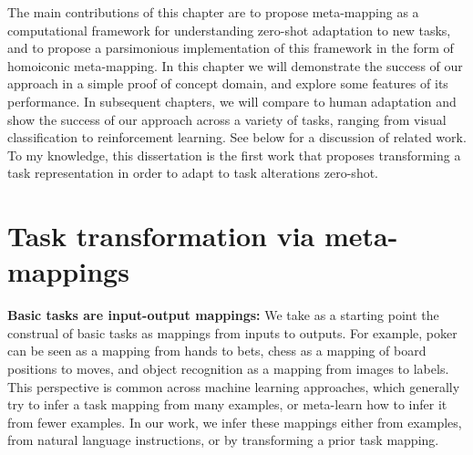 
The main contributions of this chapter are to propose meta-mapping as a computational framework for understanding zero-shot adaptation to new tasks, and to propose a parsimonious implementation of this framework in the form of homoiconic meta-mapping. In this chapter we will demonstrate the success of our approach in a simple proof of concept domain, and explore some features of its performance. In subsequent chapters, we will compare to human adaptation and show the success of our approach across a variety of tasks, ranging from visual classification to reinforcement learning. See below for a discussion of related work. To my knowledge, this dissertation is the first work that proposes transforming a task representation in order to adapt to task alterations zero-shot. 


\section{Task transformation via meta-mappings} \label{sec:HoMM:metamappings}

\textbf{Basic tasks are input-output mappings:} We take as a starting point the construal of basic tasks as mappings from inputs to outputs. For example, poker can be seen as a mapping from hands to bets, chess as a mapping of board positions to moves, and object recognition as a mapping from images to labels. This perspective is common across machine learning approaches, which generally try to infer a task mapping from many examples, or meta-learn how to infer it from fewer examples. In our work, we infer these mappings either from examples, from natural language instructions, or by transforming a prior task mapping. 

